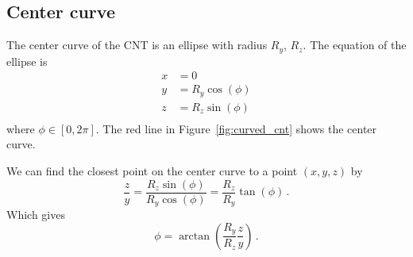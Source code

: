 \documentclass[a4paper,10pt]{article}
\numberwithin{equation}{section}
\begin{document}
\subsection{Center curve}
The center curve of the CNT is an ellipse with radius \(R_y\), \(R_z\). The equation of the ellipse is
\begin{align}
  x &= 0\\
  y &= R_y\cos(\phi)\\
  z &= R_z\sin(\phi)\\
\end{align}
where \(\phi \in [0, 2\pi]\). The red line in Figure~\ref{fig:curved_cnt} shows the center curve.

We can find the closest point on the center curve to a point \((x, y, z)\) by
\begin{equation}
  \frac{z}{y} = \frac{R_z\sin(\phi)}{R_y\cos(\phi)} = \frac{R_z}{R_y}\tan(\phi)\, .
\end{equation}
Which gives
\begin{equation}
  \phi = \arctan\left( \frac{R_y}{R_z}\frac{z}{y} \right)\, .
\end{equation}

\cleardoublepage\printbibliography
\end{document}
